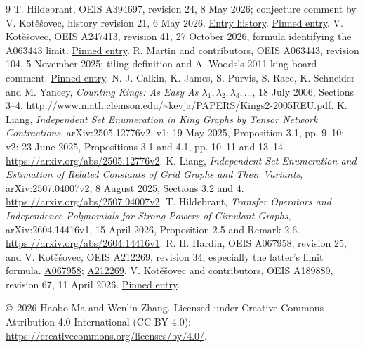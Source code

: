 \documentclass[10pt]{article}
\begin{document}
\begin{thebibliography}{9}\small
{} T. Hildebrant, OEIS A394697, revision 24, 8 May 2026;
conjecture comment by V. Kot\v{e}\v{s}ovec, history revision 21, 6 May 2026.
\href{https://oeis.org/history?seq=A394697}{Entry history}.
\href{https://github.com/oeis/oeisdata/blob/77073cc8105b8042be07ec0d885da5ea5960ff3c/seq/A394/A394697.seq}{Pinned entry}.
 V. Kot\v{e}\v{s}ovec, OEIS A247413, revision 41,
27 October 2026, formula identifying the A063443 limit.
\href{https://github.com/oeis/oeisdata/blob/77073cc8105b8042be07ec0d885da5ea5960ff3c/seq/A247/A247413.seq}{Pinned entry}.
 R. Martin and contributors, OEIS A063443, revision
104, 5 November 2025; tiling definition and A. Woods's 2011 king-board
comment. \href{https://github.com/oeis/oeisdata/blob/77073cc8105b8042be07ec0d885da5ea5960ff3c/seq/A063/A063443.seq}{Pinned entry}.
 N. J. Calkin, K. James, S. Purvis, S. Race,
K. Schneider and M. Yancey, \emph{Counting Kings: As Easy As
$\lambda_1,\lambda_2,\lambda_3,\ldots$}, 18 July 2006, Sections 3--4.
\url{http://www.math.clemson.edu/~kevja/PAPERS/Kings2-2005REU.pdf}.
 K. Liang, \emph{Independent Set Enumeration in King
Graphs by Tensor Network Contractions}, arXiv:2505.12776v2,
v1: 19 May 2025, Proposition 3.1, pp. 9--10;
v2: 23 June 2025, Propositions 3.1 and 4.1, pp. 10--11 and 13--14.
\url{https://arxiv.org/abs/2505.12776v2}.
 K. Liang, \emph{Independent Set Enumeration and
Estimation of Related Constants of Grid Graphs and Their Variants}, arXiv:2507.04007v2,
8 August 2025, Sections 3.2 and 4.
\url{https://arxiv.org/abs/2507.04007v2}.
 T. Hildebrant, \emph{Transfer Operators and
Independence Polynomials for Strong Powers of Circulant Graphs},
arXiv:2604.14416v1, 15 April 2026, Proposition 2.5 and Remark 2.6.
\url{https://arxiv.org/abs/2604.14416v1}.
 R. H. Hardin, OEIS A067958, revision 25, and
V. Kot\v{e}\v{s}ovec, OEIS A212269, revision 34, especially the latter's
limit formula.
\href{https://github.com/oeis/oeisdata/blob/77073cc8105b8042be07ec0d885da5ea5960ff3c/seq/A067/A067958.seq}{A067958};
\href{https://github.com/oeis/oeisdata/blob/77073cc8105b8042be07ec0d885da5ea5960ff3c/seq/A212/A212269.seq}{A212269}.
 V. Kot\v{e}\v{s}ovec and contributors, OEIS A189889,
revision 67, 11 April 2026.
\href{https://github.com/oeis/oeisdata/blob/77073cc8105b8042be07ec0d885da5ea5960ff3c/seq/A189/A189889.seq}{Pinned entry}.
\end{thebibliography}
\bigskip
\noindent\small\copyright\ 2026 Haobo Ma and Wenlin Zhang.
Licensed under Creative Commons Attribution 4.0 International
(CC BY 4.0): \url{https://creativecommons.org/licenses/by/4.0/}.
\end{document}
